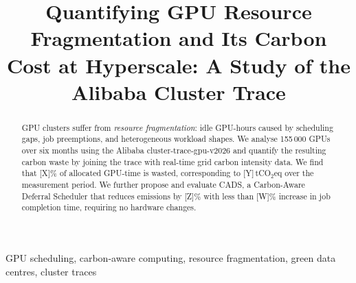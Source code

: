 \documentclass[conference]{IEEEtran}
\title{Quantifying GPU Resource Fragmentation and Its Carbon Cost at Hyperscale:
       A Study of the Alibaba Cluster Trace}
\author{%
  \IEEEauthorblockN{Author Name}
  \IEEEauthorblockA{%
    \textit{Affiliation}\\
    City, Country \\
    email@example.com}
}
\begin{document}
\maketitle

\begin{abstract}
GPU clusters suffer from \emph{resource fragmentation}: idle GPU-hours caused
by scheduling gaps, job preemptions, and heterogeneous workload shapes.
We analyse 155\,000 GPUs over six months using the Alibaba
cluster-trace-gpu-v2026 and quantify the resulting carbon waste by joining
the trace with real-time grid carbon intensity data.
We find that [X]\% of allocated GPU-time is wasted, corresponding to
[Y]\,tCO$_2$eq over the measurement period.
We further propose and evaluate CADS, a Carbon-Aware Deferral Scheduler that
reduces emissions by [Z]\% with less than [W]\% increase in job completion
time, requiring no hardware changes.
\end{abstract}

\begin{IEEEkeywords}
GPU scheduling, carbon-aware computing, resource fragmentation, green data
centres, cluster traces
\end{IEEEkeywords}














\end{document}
